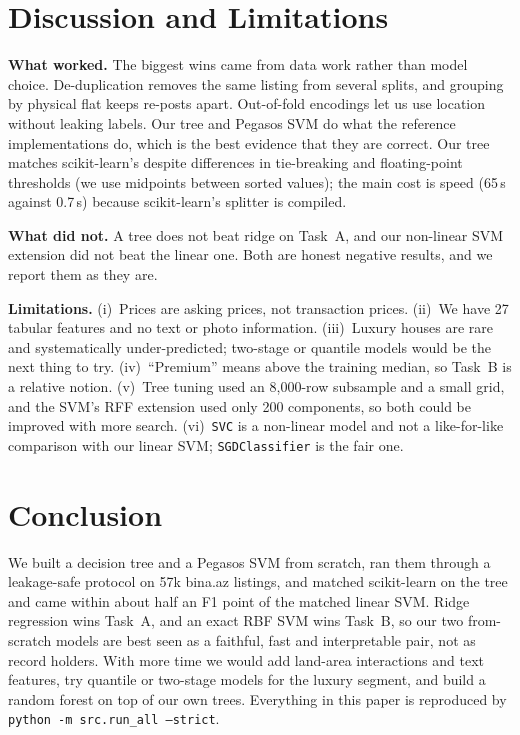 \documentclass[10pt,twocolumn,a4paper]{article}
\begin{document}
\section{Discussion and Limitations}
\textbf{What worked.} The biggest wins came from data work rather than model choice.
De-duplication removes the same listing from several splits, and grouping by physical
flat keeps re-posts apart. Out-of-fold encodings let us use location without leaking
labels. Our tree and Pegasos SVM do what the reference implementations do, which is the
best evidence that they are correct. Our tree matches scikit-learn's despite
differences in tie-breaking and floating-point thresholds (we use midpoints between
sorted values); the main cost is speed (65\,s against 0.7\,s) because
scikit-learn's splitter is compiled.

\textbf{What did not.} A tree does not beat ridge on Task~A, and our non-linear
SVM extension did not beat the linear one. Both are honest negative results, and we
report them as they are.

\textbf{Limitations.} (i)~Prices are asking prices, not transaction prices.
(ii)~We have 27 tabular features and no text or photo information.
(iii)~Luxury houses are rare and systematically under-predicted; two-stage or quantile
models would be the next thing to try. (iv)~``Premium'' means above the training median, so
Task~B is a relative notion. (v)~Tree tuning used an 8{,}000-row subsample and a
small grid, and the SVM's RFF extension used only 200 components, so both could be
improved with more search. (vi)~\texttt{SVC} is a non-linear model and
not a like-for-like comparison with our linear SVM; \texttt{SGDClassifier} is the fair one.

\section{Conclusion}
We built a decision tree and a Pegasos SVM from scratch, ran them through a
leakage-safe protocol on 57k bina.az listings, and matched scikit-learn
on the tree and came within about half an F1 point of the matched linear SVM.
Ridge regression wins Task~A, and an exact RBF SVM wins Task~B, so our two
from-scratch models are best seen as a faithful, fast and interpretable pair,
not as record holders. With more time we would add land-area interactions and
text features, try quantile or two-stage models for the luxury segment, and
build a random forest on top of our own trees. Everything in this paper
is reproduced by \texttt{python -m src.run\_all --strict}.
\end{document}
